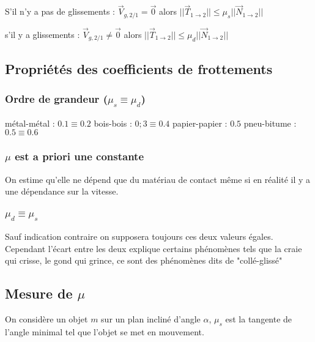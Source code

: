 \documentclass[a4paper,french,bookmarks]{book}
\begin{document}
        \begin{enumerate}
            \itt S'il n'y a pas de glissements : \(\vec V_{g,2/1} = \vec 0\) alors \( || \vec T_{1\to 2} || \leq \mu_s || \vec N_{1\to 2} ||\)

            \itt s'il y a glissements : \(\vec V_{g,2/1} \neq \vec 0\) alors \( || \vec T_{1\to 2} || \leq \mu_d || \vec N_{1\to 2} ||\)
            
        \end{enumerate}

    \subsection{Propriétés des coefficients de frottements}

        \subsubsection{Ordre de grandeur (\(\mu_s \equiv \mu_d\))}

            \begin{enumerate}
                \itt métal-métal : \(0.1 \equiv 0.2\)
                \itt bois-bois : \(0;3 \equiv 0.4\)
                \itt papier-papier : \(0.5\)
                \itt pneu-bitume : \(0.5 \equiv 0.6\)
            \end{enumerate}

        \subsubsection{\(\mu\) est a priori une constante}
            On estime qu'elle ne dépend que du matériau de contact même si en réalité il y a une dépendance sur la vitesse.

        \subsubsection{\(\mu_d \equiv \mu_s\)}
            Sauf indication contraire on supposera toujours ces deux valeurs égales. Cependant l'écart entre les deux explique certains phénomènes tels que la craie qui crisse, le gond qui grince, ce sont des phénomènes dits de "collé-glissé"

        \subsection{Mesure de \(\mu\)}
            On considère un objet \(m\) sur un plan incliné d'angle \(\alpha\), \(\mu_s\) est la tangente de l'angle minimal tel que l'objet se met en mouvement.
\end{document}
